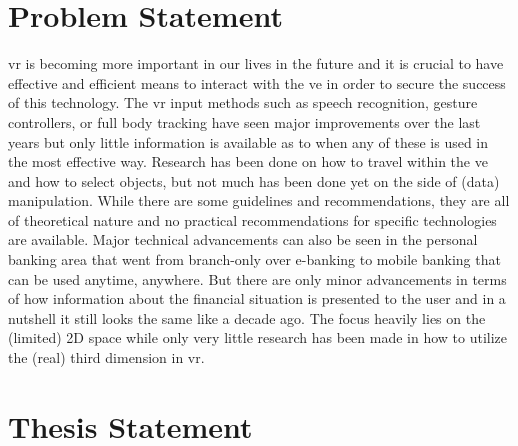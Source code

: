 
\section{Problem Statement}

\gls{vr} is becoming more important in our lives in the future and it is crucial to have effective and efficient means to interact with the \gls{ve} in order to secure the success of this technology. The \gls{vr} input methods such as speech recognition, gesture controllers, or full body tracking have seen major improvements over the last years but only little information is available as to when any of these is used in the most effective way. Research has been done on how to travel within the \gls{ve} and how to select objects, but not much has been done yet on the side of (data) manipulation. While there are some guidelines and recommendations, they are all of theoretical nature and no practical recommendations for specific technologies are available.\newline
Major technical advancements can also be seen in the personal banking area that went from branch-only over e-banking to mobile banking that can be used anytime, anywhere. But there are only minor advancements in terms of how information about the financial situation is presented to the user and in a nutshell it still looks the same like a decade ago. The focus heavily lies on the (limited) 2D space while only very little research has been made in how to utilize the (real) third dimension in \gls{vr}.



\section{Thesis Statement}

\newcommand{\thesisstatementtext}{Exploratory analysis of categorized financial data can be enhanced by utilizing state-of-the-art input methods and interaction patterns in virtual reality.}

\label{TS}

